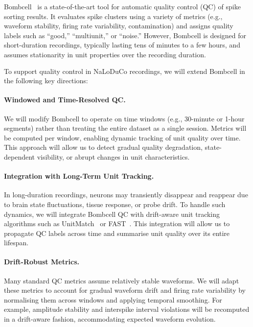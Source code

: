 
Bombcell~\citep{fabreEtAl23} is a state-of-the-art tool for automatic quality control (QC) of spike sorting results. It evaluates spike clusters using a variety of metrics (e.g., waveform stability, firing rate variability, contamination) and assigns quality labels such as ``good,'' ``multiunit,'' or ``noise.'' However, Bombcell is designed for short-duration recordings, typically lasting tens of minutes to a few hours, and assumes stationarity in unit properties over the recording duration.

To support quality control in NaLoDuCo recordings, we will extend Bombcell in the following key directions:

\paragraph{Windowed and Time-Resolved QC.}
We will modify Bombcell to operate on time windows (e.g., 30-minute or 1-hour segments) rather than treating the entire dataset as a single session. Metrics will be computed per window, enabling dynamic tracking of unit quality over time. This approach will allow us to detect gradual quality degradation, state-dependent visibility, or abrupt changes in unit characteristics.

\paragraph{Integration with Long-Term Unit Tracking.}
In long-duration recordings, neurons may transiently disappear and reappear due to brain state fluctuations, tissue response, or probe drift. To handle such dynamics, we will integrate Bombcell QC with drift-aware unit tracking algorithms such as UnitMatch~\citep{vanBeestEtAl24} or FAST~\citep{dhawaleEtAl17}. This integration will allow us to propagate QC labels across time and summarise unit quality over its entire lifespan.

\paragraph{Drift-Robust Metrics.}
Many standard QC metrics assume relatively stable waveforms. We will adapt these metrics to account for gradual waveform drift and firing rate variability by normalising them across windows and applying temporal smoothing. For example, amplitude stability and interspike interval violations will be recomputed in a drift-aware fashion, accommodating expected waveform evolution.


